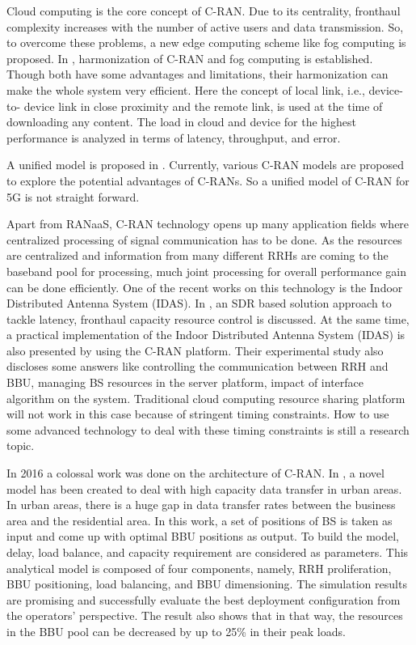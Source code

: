 \begin{multicols}{2}
Cloud computing is the core concept of C-RAN. Due to its centrality, fronthaul complexity increases with the number of active users and data transmission. So, to overcome these problems, a new edge computing scheme like fog computing is proposed. In \cite{art3-key21}, harmonization of C-RAN and fog computing is established. Though both have some advantages and limitations, their harmonization can make the whole system very efficient. Here the concept of local link, i.e., device-to- device link in close proximity and the remote link, is used at the time of downloading any content. The load in cloud and device for the highest performance is analyzed in terms of latency, throughput, and error.

A unified model is proposed in \cite{art3-key22}. Currently, various C-RAN models are proposed to explore the potential advantages of C-RANs. So a unified model of C-RAN for 5G is not straight forward.

Apart from RANaaS, C-RAN technology opens up many application fields where centralized processing of signal communication has to be done. As the resources are centralized and information from many different RRHs are coming to the baseband pool for processing, much joint processing for overall performance gain can be done efficiently. One of the recent works on this technology is the Indoor Distributed Antenna System (IDAS). In \cite{art3-key23}, an SDR based solution approach to tackle latency, fronthaul capacity resource control is discussed. At the same time, a practical implementation of the Indoor Distributed Antenna System (IDAS) is also presented by using the C-RAN platform. Their experimental study also discloses some answers like controlling the communication between RRH and BBU, managing BS resources in the server platform, impact of interface algorithm on the system. Traditional cloud computing resource sharing platform will not work in this case because of stringent timing constraints. How to use some advanced technology to deal with these timing constraints is still a research topic. 

In 2016 a colossal work was done on the architecture of C-RAN. In \cite{art3-key24}, a novel model has been created to deal with high capacity data transfer in urban areas. In urban areas, there is a huge gap in data transfer rates between the business area and the residential area. In this work, a set of positions of BS is taken as input and come up with optimal BBU positions as output. To build the model, delay, load balance, and capacity requirement are considered as parameters. This analytical model is composed of four components, namely, RRH proliferation, BBU positioning, load balancing, and BBU dimensioning. The simulation results are promising and successfully evaluate the best deployment configuration from the operators’ perspective. The result also shows that in that way, the resources in the BBU pool can be decreased by up to 25\% in their peak loads.


\end{multicols}
